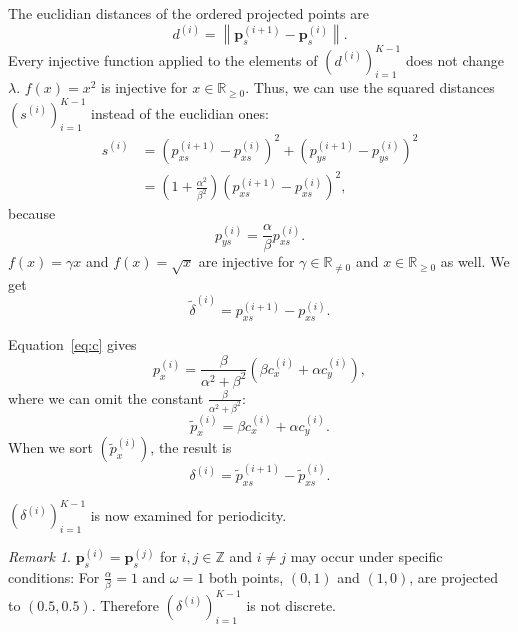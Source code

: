 \documentclass[11pt]{article}
\theoremstyle{remark}
\newtheorem{remark}{Remark}
\begin{document}
The euclidian distances of the ordered projected points are
%
\begin{equation}
d^{(i)} = \left\lVert \mathbf{p}^{(i+1)}_s - \mathbf{p}^{(i)}_s \right\rVert.
\end{equation}
%
Every injective function applied to the elements of $\left(d^{(i)}\right)_{i=1}^{K-1}$ does not change $\lambda$.
%
$f(x) = x^2$ is injective for $x \in \mathbb{R}_{\geq 0}$. Thus, we can use the squared distances $\left(s^{(i)}\right)_{i=1}^{K-1}$ instead of the euclidian ones:
%
\begin{align}
s^{(i)} &= \left(p_{x s}^{(i+1)} - p_{x s}^{(i)}\right)^2 + \left(p_{y s}^{(i+1)} - p_{y s}^{(i)}\right)^2 \\
                      &= \left(1 + \frac{\alpha^2}{\beta^2} \right) \left(p_{x s}^{(i+1)} - p_{x s}^{(i)}\right)^2,
\end{align}
%
because
%
\begin{equation}
p_{y s}^{(i)} = \frac{\alpha}{\beta} p_{x s}^{(i)}.
\end{equation}
%
$f(x) = \gamma x$ and $f(x) = \sqrt{x}$ are injective for $\gamma \in \mathbb{R}_{\ne 0}$ and $x \in \mathbb{R}_{\geq 0}$ as well. We get
%
\begin{equation}
\tilde{\delta}^{(i)} = p_{x s}^{(i+1)} - p_{x s}^{(i)}.\label{eq:delta1}
\end{equation}

Equation~\eqref{eq:c} gives
\begin{equation}
p_x^{(i)} = \frac{\beta}{\alpha^2 + \beta^2} \left(\beta c_x^{(i)} + \alpha c_y^{(i)}\right),
\end{equation}
%
where we can omit the constant $\frac{\beta}{\alpha^2 + \beta^2}$:
%
\begin{equation}
\tilde{p}_x^{(i)} = \beta c_x^{(i)} + \alpha c_y^{(i)}.
\end{equation}
When we sort $\left(\tilde{p}_x^{(i)}\right)$, the result is
\begin{equation}
\delta^{(i)} = \tilde{p}_{x s}^{(i+1)} - \tilde{p}_{x s}^{(i)}\label{eq:delta2}.
\end{equation}

$\left(\delta^{(i)}\right)_{i=1}^{K-1}$ is now examined for periodicity.

\begin{remark}
$\mathbf{p}_s^{(i)} = \mathbf{p}_s^{(j)}$ for $i, j \in \mathbb{Z}$ and $i \ne j$ may occur under specific conditions: For $\frac{\alpha}{\beta} = 1$ and $\omega = 1$ both points, $(0, 1)$ and $(1, 0)$, are projected to $(0.5, 0.5)$. Therefore $\left(\delta^{(i)}\right)_{i=1}^{K-1}$ is not discrete.
\end{remark}
\end{document}
